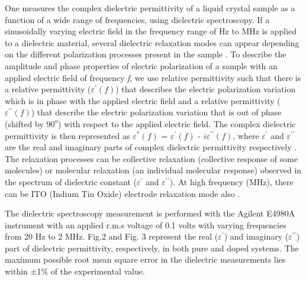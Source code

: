 \documentclass[reprint,amsfonts,amsmath,amssymb,aps,pre,floatfix,10pt]{revtex4-1}
\begin{document}
One measures the complex dielectric permittivity of a liquid crystal sample as a function of a wide range of frequencies, using dielectric spectroscopy. If a sinusoidally varying electric field in the frequency range of Hz to MHz is applied to a dielectric material, several dielectric relaxation modes can appear depending on the different polarization processes present in the sample \cite{patranabish2021quantum_38}. To describe the amplitude and phase properties of electric polarization of a sample with an applied electric field of frequency \textit{f}, we use relative permittivity such that there is a relative permittivity ($\varepsilon^{\prime}(f)$) that describes the electric polarization variation which is in phase with the applied electric field and a relative permittivity ($\varepsilon^{\prime\prime}(f)$) that describe the electric polarization variation that is out of phase (shifted by $90^o$) with respect to the applied electric field. The complex dielectric permittivity is then represented as $\varepsilon^{\ast}(f)$ = $\varepsilon^{\prime}(f)$ - $i\varepsilon^{\prime\prime}(f)$, where $\varepsilon^{\prime}$ and $\varepsilon^{\prime\prime}$ are the real and imaginary parts of complex dielectric permittivity respectively \cite{haase2013relaxation_43}. The relaxation processes can be collective relaxation (collective response of some molecules) or molecular relaxation (an individual molecular response) observed in the spectrum of dielectric constant ($\varepsilon^\prime$ and $\varepsilon^{\prime\prime}$). At high frequency (MHz), there can be ITO (Indium Tin Oxide) electrode relaxation mode also \cite{patranabish2021quantum_38}.

The dielectric spectroscopy measurement is performed with the Agilent E4980A instrument with an applied r.m.s voltage of 0.1 volts with varying frequencies from 20 Hz to 2 MHz. Fig.2 and Fig. 3 represent the real ($\varepsilon^\prime$) and imaginary ($\varepsilon^{\prime\prime}$) part of dielectric permittivity, respectively, in both pure and doped systems. The maximum possible root mean square error in the dielectric measurements lies within ±1$\%$ of the experimental value.
\end{document}
